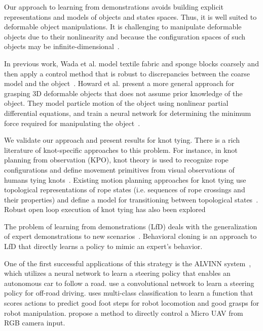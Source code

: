 Our approach to learning from demonstrations avoids building explicit representations
and models of objects and states spaces. Thus, it is well suited to deformable object 
manipulations. It is challenging to manipulate deformable objects due to their nonlinearity
and because the configuration spaces of such objects may be
infinite-dimensional~\cite{Lamiraux_IJRR2001}.

In previous work, Wada et al. model textile fabric and sponge blocks
coarsely and then apply a control method that is robust
to discrepancies between the coarse model and the
object~\cite{Wada_ArticMotion2000}. Howard et al. present a more
general approach for grasping 3D deformable objects
that does not assume prior knowledge of the object.
They model particle motion of the object using nonlinear partial differential
equations, and train a neural network for determining the minimum force
required for manipulating the object~\cite{Howard_AutRobots2000}.

We validate our approach and present results for knot tying. There is
a rich literature of knot-specific approaches to this problem.
For instance, in knot planning from observation (KPO), knot theory is used
to recognize rope configurations and define
movement primitives from visual observations of humans tying
knots~\cite{Morita_ICRA2003, Takamatsu_TransRob2006}.
Existing motion planning approaches for knot tying use topological
representations of rope states (i.e. sequences of rope crossings and their
properties) and define a model for transitioning between topological
states~\cite{Moll_IEEERobot2006, Saha_ExpRobotics2008, Wakamatsu_IJRR2006}.
Robust open loop execution of knot tying has also been explored~\cite{Bell_PhD2010}

The problem of learning from demonstrations (LfD) deals with the generalization of expert demonstrations to 
new scenarios~\cite{Argall_2009, Schaal_1999}. Behavioral cloning is an approach to LfD that 
directly learns a policy to mimic an expert's behavior.

One of the first successful applications of this strategy is the ALVINN system~\cite{Pomerleau_NIPS1989}, which utilizes a 
neural network to learn a steering policy that enables an autonomous car to follow a road.
\cite{muller2005off} use a convolutional network to learn a steering policy for off-road driving.
\cite{Ratliff_Humanoids2007} uses multi-class classification to learn a function that scores actions 
to predict good foot steps for robot locomotion and good grasps for robot manipulation.
\cite{Ross_2013} propose a method to directly control a Micro UAV from RGB camera input.

